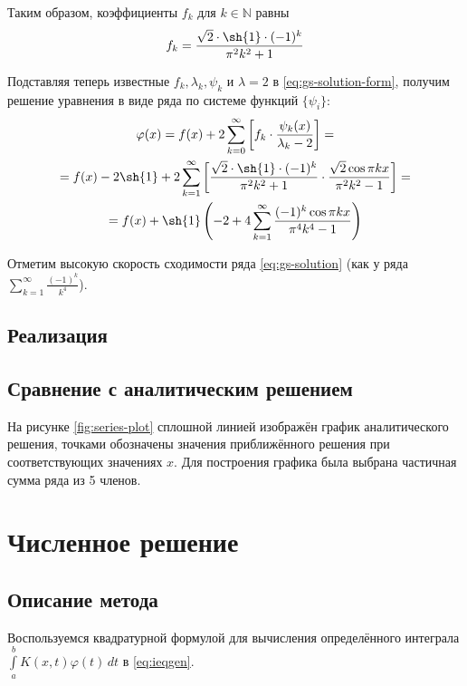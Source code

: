 \documentclass[11pt]{article}
\numberwithin{equation}{section}
\renewcommand{\phi}{\varphi}
\newcommand{\intl}{\int\limits}
\newcommand{\set}[1]{\mathbb{#1}}
\begin{document}
Таким образом, коэффициенты $f_k$ для $k \in \set{N}$ равны
\begin{equation}
  f_k = \frac{\sqrt{2} \cdot \sh{1}\cdot (-1)^k}{\pi^2 k^2 + 1}
\end{equation}

Подставляя теперь известные $f_k, \lambda_k, \psi_k$ и $\lambda = 2$ в
\eqref{eq:gs-solution-form}, получим решение уравнения в виде ряда по
системе функций $\{\psi_i\}$:
\begin{multline}
  \label{eq:gs-solution}
  \phi(x) = f(x) + 2 \sum_{k=0}^\infty \left [
    f_k\cdot\frac{\psi_k(x)}{\lambda_k-2} \right ] = \\
  = f(x) - 2 \sh{1} + 2 \sum_{k=1}^\infty\left [ \frac{\sqrt{2} \cdot
      \sh{1}\cdot (-1)^k}{\pi^2 k^2 + 1} \cdot \frac{\sqrt{2}\cos{\pi
        k x}}{\pi^2 k^2 - 1} \right ] = \\
  = f(x) + \sh{1} \left ( -2 + 4  \sum_{k=1}^\infty \frac{(-1)^k
      \cos{\pi k x}} {\pi^4 k^4 - 1} \right )
\end{multline}

Отметим высокую скорость сходимости ряда \eqref{eq:gs-solution} (как у
ряда $\sum \limits_{k=1}^\infty \frac{(-1)^k}{k^4}$).

\subsection{Реализация}
\label{sec:gs-implementation}



\clearpage
\subsection{Сравнение с аналитическим решением}

На рисунке \ref{fig:series-plot} сплошной линией изображён график
аналитического решения, точками обозначены значения приближённого
решения при соответствующих значениях $x$. Для построения графика была
выбрана частичная сумма ряда из 5 членов.




\clearpage
\section{Численное решение}
\label{sec:numerical}
\subsection{Описание метода}
Воспользуемся квадратурной формулой для вычисления определённого
интеграла $\intl_a^b {K(x, t) \phi(t)\,dt}$ в \eqref{eq:ieqgen}.
\end{document}
